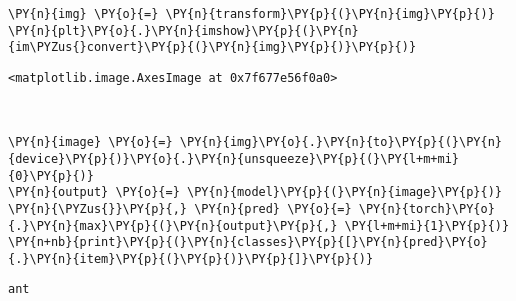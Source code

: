     \begin{tcolorbox}[breakable, size=fbox, boxrule=1pt, pad at break*=1mm,colback=cellbackground, colframe=cellborder]
\begin{Verbatim}[commandchars=\\\{\}]
\PY{n}{img} \PY{o}{=} \PY{n}{transform}\PY{p}{(}\PY{n}{img}\PY{p}{)} 
\PY{n}{plt}\PY{o}{.}\PY{n}{imshow}\PY{p}{(}\PY{n}{im\PYZus{}convert}\PY{p}{(}\PY{n}{img}\PY{p}{)}\PY{p}{)}
\end{Verbatim}
\end{tcolorbox}

            \begin{tcolorbox}[breakable, size=fbox, boxrule=.5pt, pad at break*=1mm, opacityfill=0]
\begin{Verbatim}[commandchars=\\\{\}]
<matplotlib.image.AxesImage at 0x7f677e56f0a0>
\end{Verbatim}
\end{tcolorbox}
        
    \begin{center}
    \end{center}
    { \hspace*{\fill} \\}
    
    \begin{tcolorbox}[breakable, size=fbox, boxrule=1pt, pad at break*=1mm,colback=cellbackground, colframe=cellborder]
\begin{Verbatim}[commandchars=\\\{\}]
\PY{n}{image} \PY{o}{=} \PY{n}{img}\PY{o}{.}\PY{n}{to}\PY{p}{(}\PY{n}{device}\PY{p}{)}\PY{o}{.}\PY{n}{unsqueeze}\PY{p}{(}\PY{l+m+mi}{0}\PY{p}{)}
\PY{n}{output} \PY{o}{=} \PY{n}{model}\PY{p}{(}\PY{n}{image}\PY{p}{)}
\PY{n}{\PYZus{}}\PY{p}{,} \PY{n}{pred} \PY{o}{=} \PY{n}{torch}\PY{o}{.}\PY{n}{max}\PY{p}{(}\PY{n}{output}\PY{p}{,} \PY{l+m+mi}{1}\PY{p}{)}
\PY{n+nb}{print}\PY{p}{(}\PY{n}{classes}\PY{p}{[}\PY{n}{pred}\PY{o}{.}\PY{n}{item}\PY{p}{(}\PY{p}{)}\PY{p}{]}\PY{p}{)}
\end{Verbatim}
\end{tcolorbox}

    \begin{Verbatim}[commandchars=\\\{\}]
ant
    \end{Verbatim}

